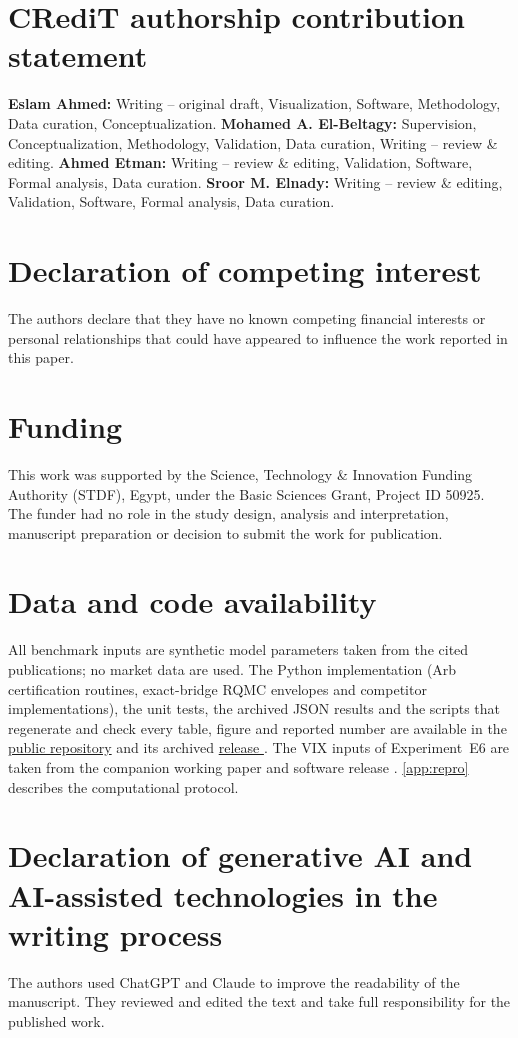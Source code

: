 \section*{CRediT authorship contribution statement}
\textbf{Eslam Ahmed:} Writing -- original draft, Visualization, Software, Methodology, Data curation, Conceptualization.
\textbf{Mohamed A. El-Beltagy:} Supervision, Conceptualization, Methodology, Validation, Data curation, Writing -- review \& editing.
\textbf{Ahmed Etman:} Writing -- review \& editing, Validation, Software, Formal analysis, Data curation.
\textbf{Sroor M. Elnady:} Writing -- review \& editing, Validation, Software, Formal analysis, Data curation.

\section*{Declaration of competing interest}
The authors declare that they have no known competing financial interests or personal relationships that could have appeared to influence the work reported in this paper.

\section*{Funding}
This work was supported by the Science, Technology \& Innovation Funding Authority (STDF), Egypt, under the Basic Sciences Grant, Project ID 50925. The funder had no role in the study design, analysis and interpretation, manuscript preparation or decision to submit the work for publication.

\section*{Data and code availability}
All benchmark inputs are synthetic model parameters taken from the cited publications; no market data are used. The Python implementation (Arb certification routines, exact-bridge RQMC envelopes and competitor implementations), the unit tests, the archived JSON results and the scripts that regenerate and check every table, figure and reported number are available in the \href{https://github.com/EslamAhmedGaber/RoughCert-SPX}{public repository} and its archived \href{\ReleaseURL}{release \ReleaseTag}. The VIX inputs of Experiment~E6 are taken from the companion working paper and software release \href{\CompanionURL}{\RoughCert{} \CompanionTag} \citep{AhmedEtAl2026RoughCert}. \ref{app:repro} describes the computational protocol.

\section*{Declaration of generative AI and AI-assisted technologies in the writing process}
The authors used ChatGPT and Claude to improve the readability of the manuscript. They reviewed and edited the text and take full responsibility for the published work.
